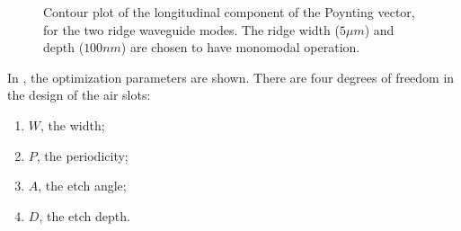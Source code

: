 \begin{figure}[htbp]
  \begin{center}
  \end{center}
  \caption{Contour plot of the longitudinal component of the Poynting
    vector, for the two ridge waveguide modes. The ridge width ($5 \mu
    m$) and depth ($100 nm$) are chosen to have monomodal operation.}
  \label{fig:polrot_ridge}
\end{figure}

In , the optimization parameters are
shown. There are four degrees of freedom in the design of the air
slots:
\begin{enumerate}
\item $W$, the width;
\item $P$, the periodicity;
\item $A$, the etch angle;
\item $D$, the etch depth.
\end{enumerate}


